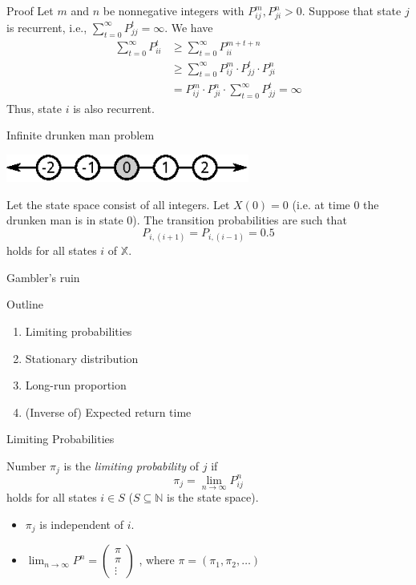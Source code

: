\documentclass[mathserif]{beamer}
\begin{document}
\begin{frame}{Proof}
	Let $m$ and $n$ be nonnegative integers with $P^m_{ij},  P^n_{ji} > 0$.
	Suppose that state $j$ is recurrent, i.e., $\sum_{t=0}^\infty P^t_{jj} = \infty$.
	We have
	\begin{align*}
	\sum_{t=0}^\infty P^t_{ii} & \geq \sum_{t=0}^\infty P^{m+t+n}_{ii} \\
	& \geq \sum_{t=0}^\infty P^m_{ij} \cdot P^t_{jj} \cdot P^n_{ji} \\
	& = P^m_{ij} \cdot P^n_{ji} \cdot \sum_{t=0}^\infty P^t_{jj} = \infty
	\end{align*}
	Thus, state $i$ is also recurrent.
\end{frame}

\begin{frame}{Infinite drunken man problem}
	\begin{center}
	\includegraphics[width=0.6\textwidth]{infinite_drunken.eps}
	\end{center}
	Let the state space consist of all integers.
	Let $X(0) = 0$ (i.e. at time 0 the drunken man is in state 0).
	The transition probabilities are such that
	\[
	P_{i, (i+1)} = P_{i, (i-1)} = 0.5
	\]
	holds for all states $i$ of $\mathbb{X}$.
\end{frame}

\begin{frame}{Gambler's ruin}
\end{frame}

\begin{frame}{Outline}
	\begin{enumerate}
		\item Limiting probabilities
		\item Stationary distribution
		\item Long-run proportion
		\item (Inverse of) Expected return time
	\end{enumerate}
\end{frame}

\begin{frame}{Limiting Probabilities}
	\begin{definition}
		Number $\pi_j$ is the \textit{limiting probability} of $j$ if
		\[
		\pi_j = \lim_{n \to \infty} P^n_{ij}
		\]
		holds for all states $i \in S$ ($S \subseteq \mathbb{N}$ is the state space).
	\end{definition}
	\begin{itemize}
		\item $\pi_j$ is independent of $i$.
		\item $\lim_{n \to \infty} P^n = 
			\begin{pmatrix}
				\pi \\
				\pi \\
				\vdots
			\end{pmatrix}$
			, where $\pi = (\pi_1, \pi_2, \ldots)$
	\end{itemize}
\end{frame}
\end{document}
